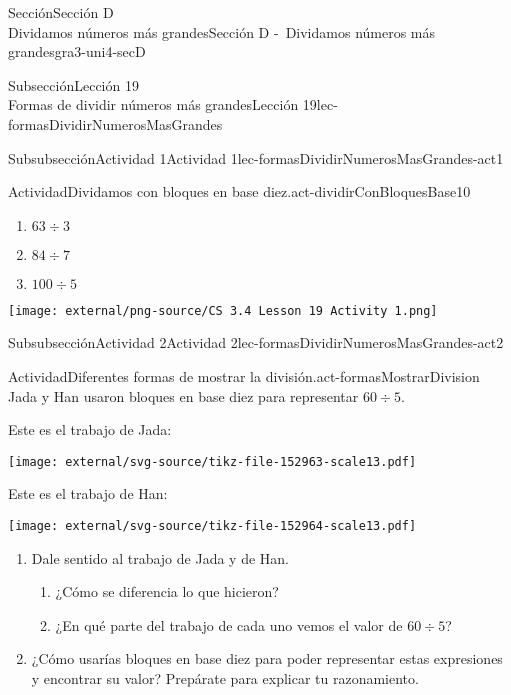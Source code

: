 \begin{sectionptx}{Sección}{{\Large Sección D\\}Dividamos números más grandes}{}{Sección D -~Dividamos números más grandes}{}{}{gra3-uni4-secD}
\begin{subsectionptx}{Subsección}{{\normalsize Lección 19\\[-0.05cm]}Formas de dividir números más grandes}{}{Lección 19}{}{}{lec-formasDividirNumerosMasGrandes}
\begin{subsubsectionptx}{Subsubsección}{Actividad 1}{}{Actividad 1}{}{}{lec-formasDividirNumerosMasGrandes-act1}
\begin{activity}{Actividad}{Dividamos con bloques en base diez.}{act-dividirConBloquesBase10}
\begin{sidebyside}{2}{0}{0}{0.1}
\begin{sbspanel}{0.7}
\begin{enumerate}
%
\begin{enumerate}
\item{}\(\displaystyle 63 \div 3\)%
\item{}\(\displaystyle 84 \div 7\)%
\item{}\(\displaystyle 100 \div 5\)%
\end{enumerate}
\end{enumerate}
\end{sbspanel}%
\begin{sbspanel}{0.2}%
\texttt{[image: external/png-source/CS 3.4 Lesson 19 Activity 1.png]}
\end{sbspanel}%
\end{sidebyside}%
\end{activity}%
\end{subsubsectionptx}
%
%
\typeout{************************************************}
\typeout{************************************************}
%
\clearpage
\begin{subsubsectionptx}{Subsubsección}{Actividad 2}{}{Actividad 2}{}{}{lec-formasDividirNumerosMasGrandes-act2}
\begin{activity}{Actividad}{Diferentes formas de mostrar la división.}{act-formasMostrarDivision}%
Jada y Han usaron bloques en base diez para representar \(60 \div 5\).%
\par
Este es el trabajo de Jada:%
\begin{image}{0}{1}{0}{}%
\texttt{[image: external/svg-source/tikz-file-152963-scale13.pdf]}
\end{image}%
Este es el trabajo de Han:%
\begin{image}{0}{1}{0}{}%
\texttt{[image: external/svg-source/tikz-file-152964-scale13.pdf]}
\end{image}%
%
\begin{enumerate}
\item{}Dale sentido al trabajo de Jada y de Han.%
%
\begin{enumerate}
\item{}¿Cómo se diferencia lo que hicieron?%
\item{}¿En qué parte del trabajo de cada uno vemos el valor de \(60 \div 5\)?%
\end{enumerate}
\item{}¿Cómo usarías bloques en base diez para poder representar estas expresiones y encontrar su valor? Prepárate para explicar tu razonamiento.%
%
\begin{enumerate}

\end{enumerate}
\end{enumerate}
\end{activity}
\end{subsubsectionptx}
\end{subsectionptx}
\end{sectionptx}
